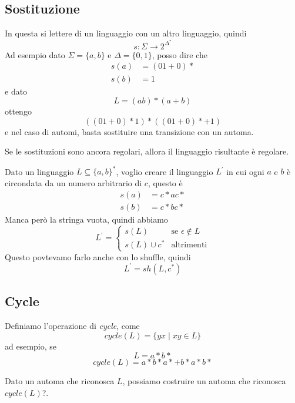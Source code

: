 \documentclass[12pt]{article}
\begin{document}
\subsection{Sostituzione}
In questa si lettere di un linguaggio con un altro linguaggio, quindi
$$ s : \Sigma \rightarrow 2^{\Delta^*} $$
Ad esempio dato $ \Sigma = \{a, b\}$ e $\Delta = \{0, 1\}$, posso dire che
\begin{align*}
	s(a) &= (01 + 0)* \\
	s(b) &= 1
\end{align*}
e dato
$$ L = (ab)*(a + b) $$
ottengo
$$ ((01 + 0)*1)*((01 + 0)* + 1) $$
e nel caso di automi, basta sostituire una transizione con un automa.

Se le sostituzioni sono ancora regolari, allora il linguaggio risultante è regolare.

\begin{tcolorbox}
	Dato un linguaggio $L \subseteq \{a, b\}^*$, voglio creare il linguaggio $L^\prime$ in cui ogni $a$ e $b$ è circondata da un numero arbitrario di $c$, questo è
	\begin{align*}
		s(a) &= c* a c* \\
		s(b) &= c* b c*
	\end{align*}
	Manca però la stringa vuota, quindi abbiamo
	$$ 
	L^\prime = 
	\begin{cases}
		s(L) & \text{se } \epsilon \not \in L \\
		s(L) \cup c^* &\text{altrimenti}
	\end{cases}
	$$
	Questo povtevamo farlo anche con lo shuffle, quindi
	$$ L^\prime = sh(L, c^*) $$
\end{tcolorbox}

\subsection{Cycle}
Definiamo l'operazione di \textit{cycle}, come
$$ cycle(L) = \{ yx \mid xy \in L \} $$
ad esempio, se
$$ L = a*b* $$
$$ cycle(L) = a*b*a* + b*a*b* $$

Dato un automa che riconosca $L$, possiamo costruire un automa che riconosca $cycle(L)$?.
\end{document}
